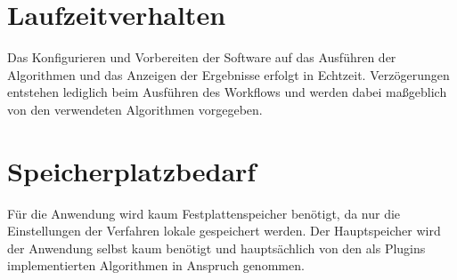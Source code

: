 \section{Laufzeitverhalten}
Das Konfigurieren und Vorbereiten der Software auf das Ausführen der Algorithmen und das Anzeigen der Ergebnisse erfolgt in Echtzeit. Verzögerungen entstehen lediglich beim Ausführen des Workflows und werden dabei maßgeblich von den verwendeten Algorithmen vorgegeben. 
\section{Speicherplatzbedarf}
Für die Anwendung wird kaum Festplattenspeicher benötigt, da nur die Einstellungen der Verfahren lokale gespeichert werden. Der Hauptspeicher wird der Anwendung selbst kaum benötigt und hauptsächlich von den als Plugins implementierten Algorithmen in Anspruch genommen.